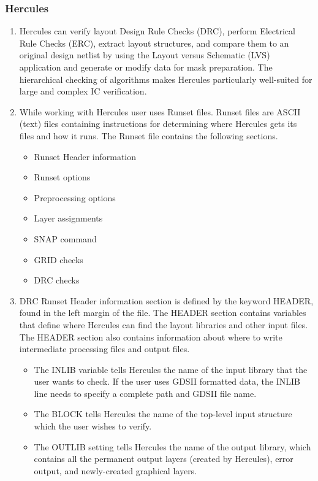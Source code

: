 \documentclass[a4paper,12pt,twoside]{article}
\begin{document}
\subsubsection{Hercules}
\begin{enumerate}
    \item Hercules can verify layout Design Rule Checks (DRC), perform Electrical Rule Checks (ERC), extract layout structures, and compare them to an original design netlist by using the Layout versus Schematic (LVS) application and generate or modify data for mask preparation. The hierarchical checking of algorithms makes Hercules particularly well-suited for large and complex IC verification.
    \item While working with Hercules user uses Runset files. Runset files are ASCII (text) files containing instructions for determining where Hercules gets its files and how it runs. The Runset file contains the following sections.
    \begin{itemize}
        \item Runset Header information
        \item Runset options
        \item Preprocessing options
        \item Layer assignments
        \item SNAP command
        \item GRID checks
        \item DRC checks
    \end{itemize}
    \item DRC Runset Header information section is defined by the keyword HEADER, found in the left margin of the file. The HEADER section contains variables that define where Hercules can find the layout libraries and other input files. The HEADER section also contains information about where to write intermediate processing files and output files.
    \begin{itemize}
        \item The INLIB variable tells Hercules the name of the input library that the user wants to check. If the user uses GDSII formatted data, the INLIB line needs to specify a complete path and GDSII file name.
        \item The BLOCK tells Hercules the name of the top-level input structure which the user wishes to verify.
        \item The OUTLIB setting tells Hercules the name of the output library, which contains all the permanent output layers (created by Hercules), error output, and newly-created graphical layers.

\end{itemize}
\end{enumerate}
\end{document}
